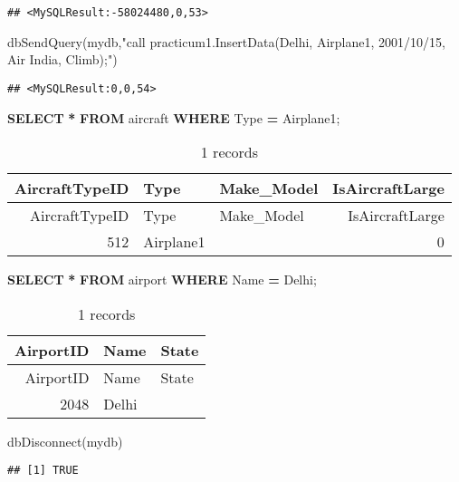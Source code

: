 \documentclass[
]{article}
\newenvironment{Shaded}{\begin{snugshade}}{\end{snugshade}}
\newcommand{\FunctionTok}[1]{\textcolor[rgb]{0.00,0.00,0.00}{#1}}
\newcommand{\KeywordTok}[1]{\textcolor[rgb]{0.13,0.29,0.53}{\textbf{#1}}}
\newcommand{\NormalTok}[1]{#1}
\newcommand{\OperatorTok}[1]{\textcolor[rgb]{0.81,0.36,0.00}{\textbf{#1}}}
\newcommand{\StringTok}[1]{\textcolor[rgb]{0.31,0.60,0.02}{#1}}
\begin{document}
\begin{verbatim}
## <MySQLResult:-58024480,0,53>
\end{verbatim}

\begin{Shaded}
\begin{Highlighting}[]
\FunctionTok{dbSendQuery}\NormalTok{(mydb,}\StringTok{"call practicum1.InsertData(\textquotesingle{}Delhi\textquotesingle{}, \textquotesingle{}Airplane1\textquotesingle{}, \textquotesingle{}2001/10/15\textquotesingle{}, \textquotesingle{}Air India\textquotesingle{}, \textquotesingle{}Climb\textquotesingle{});"}\NormalTok{)}
\end{Highlighting}
\end{Shaded}

\begin{verbatim}
## <MySQLResult:0,0,54>
\end{verbatim}

\begin{Shaded}
\begin{Highlighting}[]
\KeywordTok{SELECT} \OperatorTok{*} \KeywordTok{FROM}\NormalTok{ aircraft }\KeywordTok{WHERE}\NormalTok{ \textasciigrave{}Type\textasciigrave{} }\OperatorTok{=} \StringTok{\textquotesingle{}Airplane1\textquotesingle{}}\NormalTok{;}
\end{Highlighting}
\end{Shaded}

\begin{longtable}[]{@{}rllr@{}}
\caption{1 records}\tabularnewline
\toprule
AircraftTypeID & Type & Make\_Model & IsAircraftLarge\tabularnewline
\midrule
\endfirsthead
\toprule
AircraftTypeID & Type & Make\_Model & IsAircraftLarge\tabularnewline
\midrule
\endhead
512 & Airplane1 & & 0\tabularnewline
\bottomrule
\end{longtable}

\begin{Shaded}
\begin{Highlighting}[]
\KeywordTok{SELECT} \OperatorTok{*} \KeywordTok{FROM}\NormalTok{ airport }\KeywordTok{WHERE}\NormalTok{ \textasciigrave{}Name\textasciigrave{} }\OperatorTok{=} \StringTok{\textquotesingle{}Delhi\textquotesingle{}}\NormalTok{;}
\end{Highlighting}
\end{Shaded}

\begin{longtable}[]{@{}rll@{}}
\caption{1 records}\tabularnewline
\toprule
AirportID & Name & State\tabularnewline
\midrule
\endfirsthead
\toprule
AirportID & Name & State\tabularnewline
\midrule
\endhead
2048 & Delhi &\tabularnewline
\bottomrule
\end{longtable}

\begin{Shaded}
\begin{Highlighting}[]
\FunctionTok{dbDisconnect}\NormalTok{(mydb)}
\end{Highlighting}
\end{Shaded}

\begin{verbatim}
## [1] TRUE
\end{verbatim}
\end{document}
